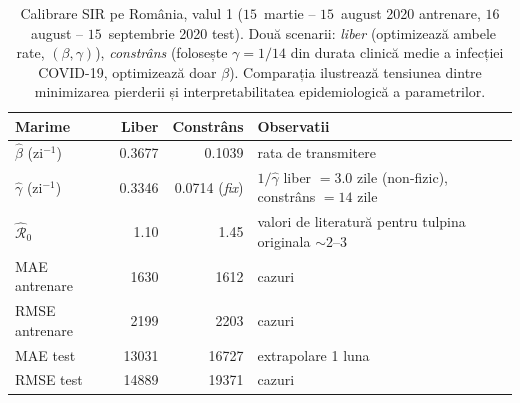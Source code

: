 \begin{table}[!htbp]
\centering
\caption[Calibrare SIR pe România]{Calibrare SIR pe România, valul 1 ($15$~martie -- $15$~august 2020 antrenare, $16$~august -- $15$~septembrie 2020 test). Două scenarii: \emph{liber} (optimizează ambele rate, $(\beta,\gamma)$), \emph{constrâns} (folosește $\gamma=1/14$ din durata clinică medie a infecției COVID-19, optimizează doar $\beta$). Comparația ilustrează tensiunea dintre minimizarea pierderii și interpretabilitatea epidemiologică a parametrilor.}
\label{tab:calibration_results}
\begin{tabularx}{\textwidth}{l r r X}
\toprule
\textbf{Marime} & \textbf{Liber} & \textbf{Constrâns} & \textbf{Observatii} \\
\midrule
$\hat{\beta}$ (zi$^{-1}$) & 0.3677 & 0.1039 & rata de transmitere \\
$\hat{\gamma}$ (zi$^{-1}$) & 0.3346 & 0.0714 (\textit{fix}) & $1/\hat{\gamma}$ liber $= 3.0$ zile (non-fizic), constrâns $= 14$ zile \\
$\hat{\mathcal{R}}_0$ & 1.10 & 1.45 & valori de literatură pentru tulpina originala $\sim 2$--$3$ \\
\midrule
MAE antrenare & 1630 & 1612 & cazuri \\
RMSE antrenare & 2199 & 2203 & cazuri \\
MAE test & 13031 & 16727 & extrapolare 1 luna \\
RMSE test & 14889 & 19371 & cazuri \\
\bottomrule
\end{tabularx}
\end{table}
